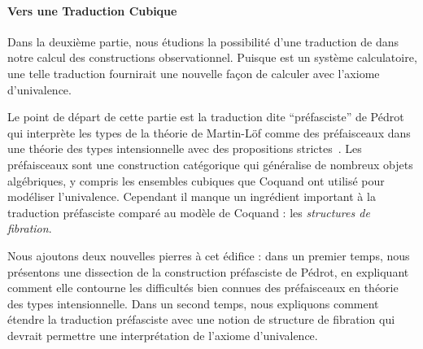 \paragraph{Vers une Traduction Cubique}
% 
Dans la deuxième partie, nous étudions la possibilité d'une traduction de 
\HoTT dans notre calcul des constructions observationnel. 
% 
Puisque \SetoidCC est un système calculatoire, une telle traduction fournirait 
une nouvelle façon de calculer avec l'axiome d'univalence. 

Le point de départ de cette partie est la traduction dite ``préfasciste'' 
de Pédrot qui interprète les types de la théorie de Martin-Löf comme des
préfaisceaux dans une théorie des types intensionnelle avec des propositions 
strictes~. 
% 
Les préfaisceaux sont une construction catégorique qui généralise de nombreux 
objets algébriques, y compris les ensembles cubiques que Coquand \etal ont 
utilisé pour modéliser l'univalence. 
% 
Cependant il manque un ingrédient important à la traduction préfasciste
comparé au modèle de Coquand \etal : les \emph{structures de fibration}.

Nous ajoutons deux nouvelles pierres à cet édifice : dans un premier temps, 
nous présentons une dissection de la construction préfasciste de Pédrot, 
en expliquant comment elle contourne les difficultés bien connues des 
préfaisceaux en théorie des types intensionnelle.
% 
Dans un second temps, nous expliquons comment étendre la traduction préfasciste 
avec une notion de structure de fibration qui devrait permettre une interprétation 
de l'axiome d'univalence.

